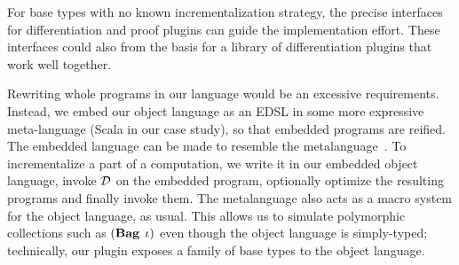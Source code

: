 
  
For base types with no known incrementalization strategy,
the precise interfaces for differentiation and
proof plugins can guide the implementation effort. These
interfaces could also from the basis for a library of
differentiation plugins that work well together.

Rewriting whole programs in our language would be an excessive
requirements. Instead, we embed our object language as an EDSL in
some more expressive meta-language (Scala in our case study), so
that embedded programs are reified. The embedded language can be
made to resemble the metalanguage~\citep{rompf2010lightweight}.
To incrementalize a part of a computation, we write it in our
embedded object language, invoke $\mathcal{D}$ on the embedded
program, optionally optimize the resulting programs and finally
invoke them. The metalanguage also acts as a macro system for the
object language, as usual. This allows us to simulate polymorphic
collections such as $\Bag*[\Gi]$ even though the object language is
simply-typed; technically, our plugin exposes a family of base
types to the object language.




